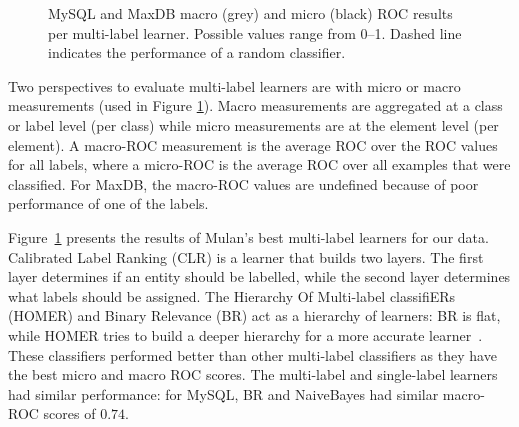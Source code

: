 \documentclass[]{sig-alternate}
\begin{document}
\begin{figure}[]
\centering
{}
\caption[]{MySQL and MaxDB macro (grey) and micro (black) ROC results per multi-label learner. Possible values range from 0--1.  Dashed line indicates the performance of a random classifier.
}
\label{fig:mulan}
\end{figure}

Two perspectives to evaluate multi-label learners are with micro or macro measurements (used in Figure \ref{fig:mulan}).
Macro measurements are aggregated at a class or label level (per class) while micro measurements are at the element level (per element).
A macro-ROC measurement is the average ROC over the ROC values for all labels, where a micro-ROC is the average ROC over all examples that were classified. 
For MaxDB, the macro-ROC values are undefined because of poor performance of one of the labels.%

Figure~\ref{fig:mulan} presents the results of Mulan's best multi-label learners for our data. 
Calibrated Label Ranking (CLR) is a learner that builds two layers. The first layer determines if an entity should be labelled, while the second layer determines what labels should be assigned.
The Hierarchy Of Multi-label classifiERs (HOMER) and Binary Relevance (BR) act as a hierarchy of learners: BR is flat, while HOMER tries to build a deeper hierarchy for a more accurate learner~\cite{mulan}. 
These classifiers performed better than other multi-label classifiers as they have the best micro and macro ROC scores. 
The multi-label and single-label learners had similar performance: for MySQL, BR and NaiveBayes had similar macro-ROC scores of $0.74$.
\end{document}

